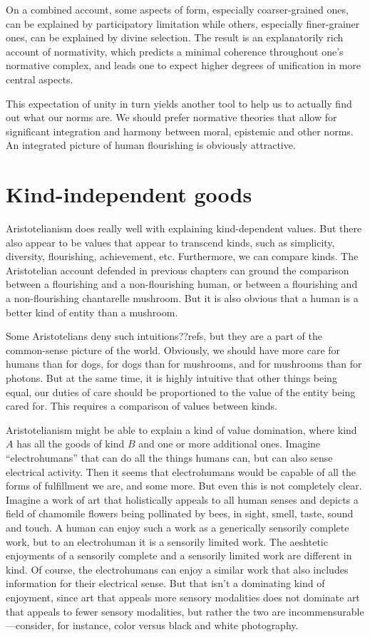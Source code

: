 On a combined account, some aspects of form, especially coarser-grained ones, can be explained by participatory 
limitation while others, especially finer-grainer ones, can be explained by divine selection. The result is an explanatorily rich account of 
normativity, which predicts a minimal coherence throughout one's normative complex, and leads one to expect higher degrees of unification
in more central aspects.

This expectation of unity in turn yields another tool to help us to actually find out what our norms are. We should prefer normative theories
that allow for significant integration and harmony between moral, epistemic and other norms. An integrated picture of human flourishing
is obviously attractive.

\section{Kind-independent goods}
Aristotelianism does really well with explaining kind-dependent values. But there also appear to be values that appear
to transcend kinds, such as simplicity, diversity, flourishing, achievement, etc. Furthermore, we can compare kinds.
The Aristotelian account defended in previous chapters can ground the comparison between a flourishing and a non-flourishing 
human, or between a flourishing and a non-flourishing chantarelle mushroom. But it is also obvious that a human is a better
kind of entity than a mushroom. 

Some Aristotelians deny such intuitions??refs, but they are a part of the common-sense picture of the world. 
Obviously, we should have more care for humans than for dogs,  for dogs than for mushrooms, and for 
mushrooms than for photons. But at the same time, it is highly intuitive that other things being equal, our 
duties of care should be proportioned to the value of the entity being cared for. This requires a comparison
of values between kinds. 

Aristotelianism might be able to explain a kind of value domination, where kind $A$ has all the goods of kind
$B$ and one or more additional ones. Imagine ``electrohumans'' that can do all the things humans can, but can also sense
electrical activity. Then it seems that electrohumans would be capable of all the forms of fulfillment we are, and 
some more. But even this is not completely clear. Imagine a work of art that holistically appeals to all
human senses and depicts a field of chamomile flowers being pollinated by bees, in sight, smell, taste, sound and touch.
A human can enjoy such a work as a generically sensorily complete work, but to an electrohuman it is a sensorily limited 
work. The aeshtetic enjoyments of a sensorily complete and a sensorily limited work are different in kind. Of course, 
the electrohumans can enjoy a similar work that also includes information for their electrical sense. But that isn't 
a dominating kind of enjoyment, since art that appeals more sensory modalities does not dominate art that appeals to 
fewer sensory modalities, but rather the two are incommensurable---consider, for instance, color versus black and white
photography. 

